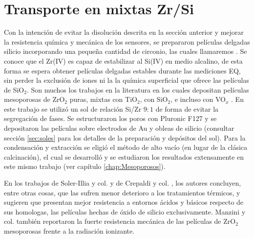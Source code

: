

	\section{Transporte en \pdm\space mixtas Zr/Si}

			Con la intención de evitar la disolución descrita en la sección anterior y mejorar la resistencia química y mecánica de los sensores, se prepararon películas delgadas silicio incorporando una pequeña cantidad de circonio, las cuales llamaremos \pdmZ. Se conoce que el Zr(IV) es capaz de estabilizar al Si(IV) en medio alcalino\cite{Soler-Illia2004}, de esta forma se espera obtener películas delgadas estables durante las mediciones EQ, sin perder la exclusión de iones ni la la química superficial que ofrece las películas de SiO$_2$. Son muchos los trabajos en la literatura en los cuales depositan películas mesoporosas de ZrO$_2$ puras, mixtas con TiO$_2$, con SiO$_2$, e incluso con VO$_x$ \cite{Soler-Illia2004,Crepaldi2002a,Gimenez2016,Zelcer2013,Calvo20210,Angelome2008}. En este trabajo se utilizó un sol de relación Si/Zr $9\!:\!1$ de forma de evitar la segregación de fases\cite{Soler-Illia2004}. Se estructuraron los poros con Pluronic F127 y se depositaron las películas sobre electrodos de Au y obleas de silicio (consultar sección \ref{sec:soles} para los detalles de la preparación y depósitos del sol). Para la condensación y extracción se eligió el método de alto vacío (en lugar de la clásica calcinación), el cual se desarrolló y se estudiaron los resultados extensamente en este mismo trabajo (ver capítulo \ref{chap:Mesoporosos}).

			En los trabajos de Soler-Illia y col.\cite{Soler-Illia2004} y de Crepaldi y col. \cite{Crepaldi2002a}, los autores concluyen, entre otras cosas, que las \pdmZ\space sufren menor deterioro a los tratamientos térmicos, y sugieren que presentan mejor resistencia a entornos ácidos y básicos respecto de sus homologas, las películas hechas de óxido de silicio exclusivamente. Manzini y col.\cite{Gimenez2016} también reportaron la fuerte resistencia mecánica de las películas de ZrO$_2$ mesoporosas frente a la radiación ionizante.


